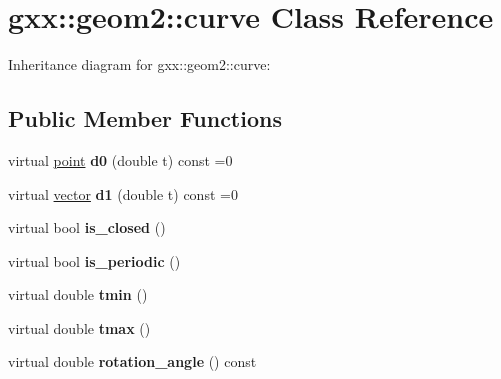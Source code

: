 \hypertarget{classgxx_1_1geom2_1_1curve}{}\section{gxx\+:\+:geom2\+:\+:curve Class Reference}
\label{classgxx_1_1geom2_1_1curve}


Inheritance diagram for gxx\+:\+:geom2\+:\+:curve\+:
\subsection*{Public Member Functions}
\begin{DoxyCompactItemize}
\item 
virtual \hyperlink{classmalgo_1_1vector2}{point} {\bfseries d0} (double t) const =0\hypertarget{classgxx_1_1geom2_1_1curve_a66cb70e2231790cfad01ccbde44e5386}{}\label{classgxx_1_1geom2_1_1curve_a66cb70e2231790cfad01ccbde44e5386}

\item 
virtual \hyperlink{classmalgo_1_1vector2}{vector} {\bfseries d1} (double t) const =0\hypertarget{classgxx_1_1geom2_1_1curve_a9420622691b23230d2abb55053892253}{}\label{classgxx_1_1geom2_1_1curve_a9420622691b23230d2abb55053892253}

\item 
virtual bool {\bfseries is\+\_\+closed} ()\hypertarget{classgxx_1_1geom2_1_1curve_a2a66df08c2ea61834f4f3c4a534d4486}{}\label{classgxx_1_1geom2_1_1curve_a2a66df08c2ea61834f4f3c4a534d4486}

\item 
virtual bool {\bfseries is\+\_\+periodic} ()\hypertarget{classgxx_1_1geom2_1_1curve_ab5c6e8656bb94e707347ef759f16e983}{}\label{classgxx_1_1geom2_1_1curve_ab5c6e8656bb94e707347ef759f16e983}

\item 
virtual double {\bfseries tmin} ()\hypertarget{classgxx_1_1geom2_1_1curve_a373183153d480ef8d9b07902f1ace1a1}{}\label{classgxx_1_1geom2_1_1curve_a373183153d480ef8d9b07902f1ace1a1}

\item 
virtual double {\bfseries tmax} ()\hypertarget{classgxx_1_1geom2_1_1curve_a8d471bd51d4cdc60f149be693214fb5a}{}\label{classgxx_1_1geom2_1_1curve_a8d471bd51d4cdc60f149be693214fb5a}

\item 
virtual double {\bfseries rotation\+\_\+angle} () const \hypertarget{classgxx_1_1geom2_1_1curve_a26efbda8dcf5d280a173f19c65d841c0}{}\label{classgxx_1_1geom2_1_1curve_a26efbda8dcf5d280a173f19c65d841c0}


\end{DoxyCompactItemize}
